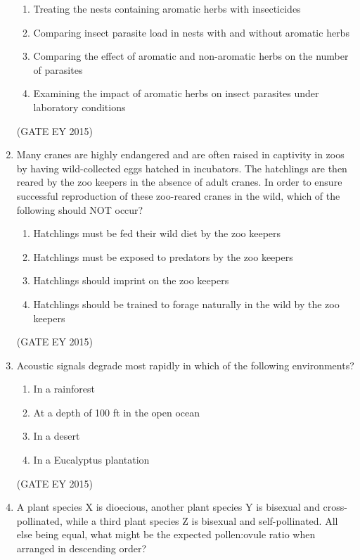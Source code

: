 \documentclass[journal,12pt,onecolumn]{IEEEtran}
\theoremstyle{remark}
\begin{document}
\begin{enumerate}
\begin{enumerate}
\item Treating the nests containing aromatic herbs with insecticides
\item Comparing insect parasite load in nests with and without aromatic herbs
\item Comparing the effect of aromatic and non-aromatic herbs on the number of parasites
\item Examining the impact of aromatic herbs on insect parasites under laboratory conditions

    \end{enumerate}
    
\hfill{(GATE EY 2015)}
\item Many cranes are highly endangered and are often raised in captivity in zoos by having wild-collected eggs hatched in incubators. The hatchlings are then reared by the zoo keepers in the absence of adult cranes. In order to ensure successful reproduction of these zoo-reared cranes in the wild, which of the following should NOT occur?

\begin{enumerate}
    
\item Hatchlings must be fed their wild diet by the zoo keepers
\item Hatchlings must be exposed to predators by the zoo keepers
\item Hatchlings should imprint on the zoo keepers
\item Hatchlings should be trained to forage naturally in the wild by the zoo keepers

    \end{enumerate}
    
\hfill{(GATE EY 2015)}
\item Acoustic signals degrade most rapidly in which of the following environments?


\begin{multicols}{2}
\begin{enumerate}
    
\item In a rainforest
\item At a depth of 100 ft in the open ocean
\item In a desert
\item In a Eucalyptus plantation

    \end{enumerate}
    \end{multicols}
\hfill{(GATE EY 2015)}
\item A plant species X is dioecious, another plant species Y is bisexual and cross-pollinated, while a third plant species Z is bisexual and self-pollinated. All else being equal, what might be the expected pollen:ovule ratio when arranged in descending order?



\end{enumerate}
\end{document}
